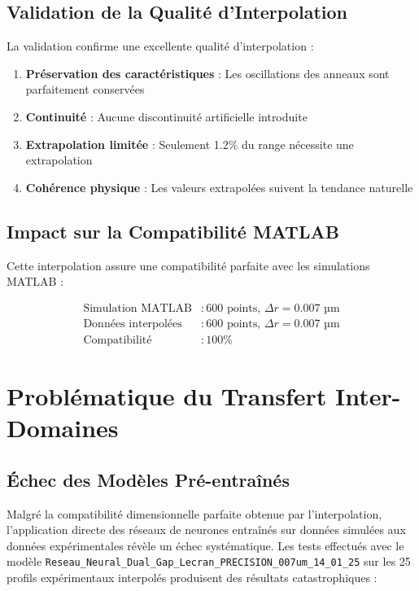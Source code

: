 \documentclass[twocolumn,10pt]{article}
\begin{document}
\subsection{Validation de la Qualité d'Interpolation}

La validation confirme une excellente qualité d'interpolation :

\begin{enumerate}
\item \textbf{Préservation des caractéristiques} : Les oscillations des anneaux sont parfaitement conservées
\item \textbf{Continuité} : Aucune discontinuité artificielle introduite
\item \textbf{Extrapolation limitée} : Seulement 1.2\% du range nécessite une extrapolation
\item \textbf{Cohérence physique} : Les valeurs extrapolées suivent la tendance naturelle
\end{enumerate}

\subsection{Impact sur la Compatibilité MATLAB}

Cette interpolation assure une compatibilité parfaite avec les simulations MATLAB :

\begin{equation}
\begin{aligned}
\text{Simulation MATLAB} &: 600 \text{ points, } \Delta r = 0.007 \text{ µm} \\
\text{Données interpolées} &: 600 \text{ points, } \Delta r = 0.007 \text{ µm} \\
\text{Compatibilité} &: 100\%
\end{aligned}
\end{equation}

\section{Problématique du Transfert Inter-Domaines}

\subsection{Échec des Modèles Pré-entraînés}

Malgré la compatibilité dimensionnelle parfaite obtenue par l'interpolation, l'application directe des réseaux de neurones entraînés sur données simulées aux données expérimentales révèle un échec systématique. Les tests effectués avec le modèle \texttt{Reseau\_Neural\_Dual\_Gap\_Lecran\_PRECISION\_007um\_14\_01\_25} sur les 25 profils expérimentaux interpolés produisent des résultats catastrophiques :
\end{document}
